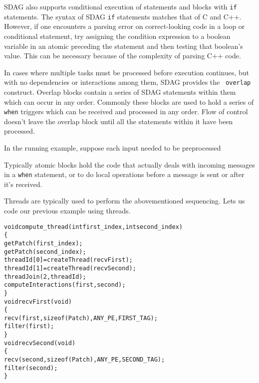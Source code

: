 SDAG also supports conditional execution of statements and blocks with {\tt if}
statements. The syntax of SDAG {\tt if} statements matches that of C and
C++. However, if one encounters a parsing error on correct-looking code in a
loop or conditional statement, try assigning the condition expression to a
boolean variable in an atomic preceding the statement and then testing that
boolean's value. This can be necessary because of the complexity of parsing C++
code.

In cases where multiple tasks must be processed before execution continues, but
with no dependencies or interactions among them, SDAG provides the {\tt
  overlap} construct. Overlap blocks contain a series of SDAG statements within
them which can occur in any order. Commonly these blocks are used to hold a
series of {\tt when} triggers which can be received and processed in any
order. Flow of control doesn't leave the overlap block until all the statements
within it have been processed.

In the running example, suppose each input needed to be preprocessed 


 Typically atomic blocks hold
the code that actually deals with incoming messages in a {\tt when} statement,
or to do local operations before a message is sent or after it's received.


Threads are typically used to perform the abovementioned sequencing.
Lets us code our previous example using threads.

\begin{center}
\begin{alltt}
void compute_thread(int first_index, int second_index)
\{
    getPatch(first_index);
    getPatch(second_index);
    threadId[0] = createThread(recvFirst);
    threadId[1] = createThread(recvSecond);
    threadJoin(2, threadId);
    computeInteractions(first, second);
  \}
  void recvFirst(void)
  \{
    recv(first, sizeof(Patch), ANY_PE, FIRST_TAG);
    filter(first);
  \}
  void recvSecond(void)
  \{
    recv(second, sizeof(Patch), ANY_PE, SECOND_TAG);
    filter(second);
  \}
\end{alltt}
\end{center}

